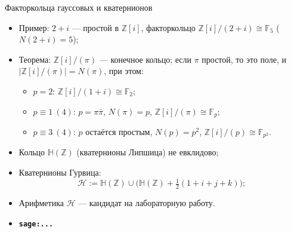 \documentclass[serif, aspectratio=169]{beamer}
\newcommand{\sagemark}{%
  \textcolor{green!40!black}{\textbf{\texttt{sage:...}}}%
}
\begin{document}
\begin{frame}{Факторкольца гауссовых и кватернионов}
    \begin{itemize}
        \item Пример: $2+i$ --- простой в $\mathbb{Z}[i]$, факторкольцо $\mathbb{Z}[i]/(2+i)\cong\mathbb{F}_5$ ($N(2+i)=5$);
        \item Теорема: $\mathbb{Z}[i]/(\pi)$ --- конечное кольцо; если $\pi$ простой, то это поле, и $|\mathbb{Z}[i]/(\pi)|=N(\pi)$, при этом:
        \begin{itemize}
            \item $p=2$: $\mathbb{Z}[i]/(1+i)\cong\mathbb{F}_2$;
            \item $p\equiv1\ (4)$: $p=\pi\bar\pi$, $N(\pi)=p$, $\mathbb{Z}[i]/(\pi)\cong\mathbb{F}_p$;
            \item $p\equiv3\ (4)$: $p$ остаётся простым, $N(p)=p^2$, $\mathbb{Z}[i]/(p)\cong\mathbb{F}_{p^2}$.
        \end{itemize}
        \item Кольцо $\mathbb{H}(\mathbb{Z})$ (кватернионы Липшица) не евклидово;
        \item Кватернионы Гурвица:
        \[\mathcal H := \mathbb{H}(\mathbb{Z}) \cup \Big(\mathbb{H}(\mathbb{Z}) + \tfrac12(1+i+j+k)\Big);\]
        \item Арифметика $\mathcal H$ --- кандидат на лабораторную работу.
        \item \sagemark
    \end{itemize}
\end{frame}
\end{document}
